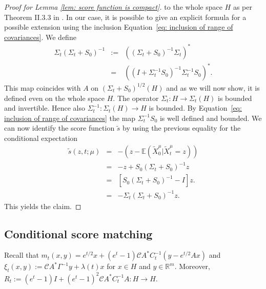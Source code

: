 \documentclass[10pt]{article} %
\def\Eqref#1{Equation~\ref{#1}}
\newcommand{\E}{\mathbb{E}}
\newcommand{\R}{\mathbb{R}}
\theoremstyle{plain}
\theoremstyle{definition}
\theoremstyle{remark}
\newcommand{\C}{\mathcal C}
\begin{document}
\begin{proof}[Proof for Lemma \ref{lem: score function is compact}]
    to the whole space $H$ as per Theorem II.3.3 in \citet{DaleckijJurijL1991Made}. In our case, it is possible to give an explicit formula for a possible extension using the inclusion \Eqref{eq: inclusion of range of covariances}. %
    We define
    \begin{eqnarray*}
        \Sigma_t (\Sigma_t + S_0)^{-1} &:=& \left( (\Sigma_t + S_0)^{-1} \Sigma_t \right)^* \\
        & = & \left( (I+ \Sigma_t^{-1}S_0)^{-1} \Sigma_t^{-1}S_0 \right)^*.
    \end{eqnarray*}
   This map coincides with $A$ on $(\Sigma_t + S_0)^{1/2}(H)$ and as we will now show, it is defined even on the whole space $H$.
   The operator $\Sigma_t: H \rightarrow \Sigma_t(H)$ is  bounded and invertible. Hence  also $\Sigma_t^{-1}: \Sigma_t(H) \rightarrow H$ is  bounded. By \Eqref{eq: inclusion of range of covariances} the map $\Sigma_t^{-1} S_0$ is well defined and bounded. 
    We can now identify the score function $\tilde s$ by using the previous equality for the conditional expectation
    \begin{eqnarray*}
        \tilde s(z, t; \mu) &=& -\left(z- \E(\widetilde{X}^{\mu}_0 |\widetilde{X}^{\mu}_t = z)\right) \\
        & = &-z + S_0 (\Sigma_t + S_0)^{-1}z \\
        & = & \left[S_0 (\Sigma_t + S_0)^{-1} - I\right]z. \\
        & = &- \Sigma_t (\Sigma_t + S_0)^{-1}z.
    \end{eqnarray*}
    This yields the claim.
    \end{proof}

\subsection{Conditional score matching}\label{sec: proof of conditional score matching}

Recall that $m_t(x, y) = e^{t/2}x + (e^t - 1)\C A^* C_t^{-1}(y - e^{t/2}Ax)$ and $\xi_t(x,y) :=  \C A^* \Gamma^{-1} y + \lambda(t) x$ for $x\in H$ and $y\in \R^m$. Moreover, $R_t := (e^t-1) I + (e^t-1)^2 \C A^* C_t^{-1} A : H\to H$.
\end{document}
